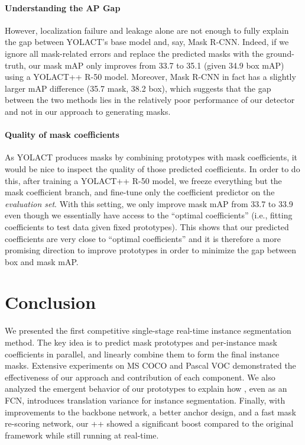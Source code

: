 \documentclass[10pt,journal,compsoc]{IEEEtran}
\begin{document}
\paragraph{Understanding the AP Gap}
However, localization failure and leakage alone are not enough to fully explain the gap between YOLACT's base model and, say, Mask R-CNN. Indeed, if we ignore all mask-related errors and replace the predicted masks with the ground-truth, our mask mAP only improves from 33.7 to 35.1 (given 34.9 box mAP) using a YOLACT++ R-50 model.  Moreover, Mask R-CNN in fact has a slightly larger mAP difference (35.7 mask, 38.2 box), which suggests that the gap between the two methods lies in the relatively poor performance of our detector and not in our approach to generating masks. 

\paragraph{Quality of mask coefficients} 
As YOLACT produces masks by combining prototypes with mask coefficients, it would be nice to inspect the quality of those predicted coefficients. In order to do this, after training a YOLACT++ R-50 model, we freeze everything but the mask coefficient branch, and fine-tune only the coefficient predictor on the \emph{evaluation set}. With this setting, we only improve mask mAP from 33.7 to 33.9 even though we essentially have access to the ``optimal coefficients'' (i.e., fitting coefficients to test data given fixed prototypes). This shows that our predicted coefficients are very close to ``optimal coefficients'' and it is therefore a more promising direction to improve prototypes in order to minimize the gap between box and mask mAP.







\section{Conclusion}
We presented the first competitive single-stage real-time instance segmentation method.  The key idea is to predict mask prototypes and per-instance mask coefficients in parallel, and linearly combine them to form the final instance masks. Extensive experiments on MS COCO and Pascal VOC demonstrated the effectiveness of our approach and contribution of each component. We also analyzed the emergent behavior of our prototypes to explain how \methodname{}, even as an FCN, introduces translation variance for instance segmentation. Finally, with improvements to the backbone network, a better anchor design, and a fast mask re-scoring network, our \methodname{}++ showed a significant boost compared to the original framework while still running at real-time.
\end{document}
